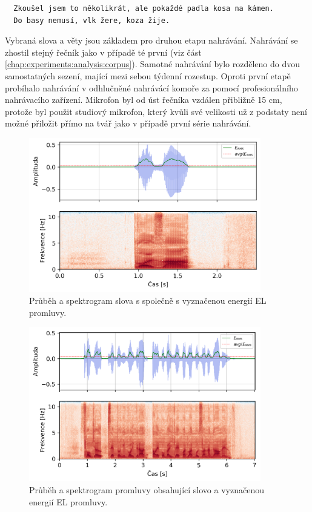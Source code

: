 \begin{verbatim}
  Zkoušel jsem to několikrát, ale pokaždé padla kosa na kámen.
  Do basy nemusí, vlk žere, koza žije.
\end{verbatim}

Vybraná slova a věty jsou základem pro druhou etapu nahrávání. Nahrávání se zhostil stejný řečník jako v případě té první (viz část \ref{chap:experiments:analysis:corpus}). Samotné nahrávání bylo rozděleno do dvou samostatných sezení, mající mezi sebou týdenní rozestup. Oproti první etapě probíhalo nahrávání v odhlučněné nahrávácí komoře za pomocí profesionálního nahrávacího zařízení. Mikrofon byl od úst řečníka vzdálen přibližně 15 cm, protože byl použit studiový mikrofon, který kvůli své velikosti už z podstaty není možné přiložit přímo na tvář jako v případě první série nahrávání.

\begin{figure}[hbpt]
  \centering
  \includegraphics[width=0.9\textwidth]{./ch4-experiments/img/energy_spec_word.png}
  \caption{Průběh a spektrogram slova  s společně s vyznačenou energií EL promluvy.}
  \label{fig:experiments:normalization:word}
\end{figure}

\begin{figure}[hbpt]
  \centering
  \includegraphics[width=0.9\textwidth]{./ch4-experiments/img/energy_spec_sentence.png}
  \caption{Průběh a spektrogram promluvy obsahující slovo  a vyznačenou energií EL promluvy.}
  \label{fig:experiments:normalization:sentence}
\end{figure}

